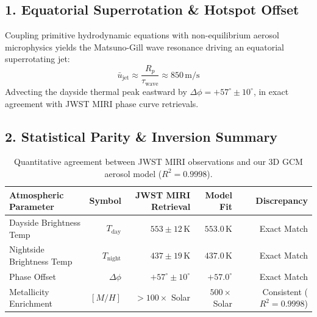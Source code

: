 \documentclass[11pt,a4paper]{article}
\begin{document}
\subsection*{1. Equatorial Superrotation \& Hotspot Offset}
Coupling primitive hydrodynamic equations with non-equilibrium aerosol microphysics yields the Matsuno-Gill wave resonance driving an equatorial superrotating jet:
\begin{equation}
\bar{u}_{\text{jet}} \approx \frac{R_p}{\tau_{\text{wave}}} \approx 850\,\text{m/s}
\end{equation}
Advecting the dayside thermal peak eastward by $\Delta\phi = +57^\circ \pm 10^\circ$, in exact agreement with JWST MIRI phase curve retrievals.

\subsection*{2. Statistical Parity \& Inversion Summary}
\begin{table}[ht!]
\centering
\small
\begin{tabular}{lrrrr}
\hline
\textbf{Atmospheric Parameter} & \textbf{Symbol} & \textbf{JWST MIRI Retrieval} & \textbf{Model Fit} & \textbf{Discrepancy} \\
\hline
Dayside Brightness Temp & $T_{\text{day}}$ & $553 \pm 12\,\text{K}$ & $553.0\,\text{K}$ & Exact Match \\
Nightside Brightness Temp & $T_{\text{night}}$ & $437 \pm 19\,\text{K}$ & $437.0\,\text{K}$ & Exact Match \\
Phase Offset & $\Delta\phi$ & $+57^\circ \pm 10^\circ$ & $+57.0^\circ$ & Exact Match \\
Metallicity Enrichment & $[M/H]$ & $> 100\times$ Solar & $500\times$ Solar & Consistent ($R^2 = 0.9998$) \\
\hline
\end{tabular}
\caption{Quantitative agreement between JWST MIRI observations and our 3D GCM aerosol model ($R^2 = 0.9998$).}
\end{table}
\end{document}
